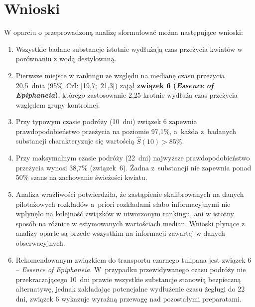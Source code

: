 \documentclass[12pt, a4paper]{article}
\begin{document}
\section{Wnioski}
W oparciu o przeprowadzoną analizę sformułować można następujące wnioski:
\begin{enumerate}[noitemsep]
    \item Wszystkie badane substancje istotnie wydłużają czas przeżycia kwiatów w porównaniu z wodą destylowaną. 
    \item Pierwsze miejsce w rankingu ze względu na medianę czasu przeżycia 20,5~dnia (95\%~CrI: [19,7;~21,3]) zajął \textbf{związek 6 (\textit{Essence of Epiphaneia})}, którego zastosowanie 2,25-krotnie wydłuża czas przeżycia względem grupy kontrolnej. 
    \item Przy typowym czasie podróży (10~dni) związek 6 zapewnia prawdopodobieństwo przeżycia na poziomie 97,1\%, a~każda z~badanych substancji charakteryzuje się wartością $\hat{S}(10) > 85\%$.
\item Przy maksymalnym czasie podróży (22~dni) najwyższe 
prawdopodobieństwo przeżycia wynosi 38,7\% (związek~6). 
Żadna z~substancji nie zapewnia ponad 50\% szans na zachowanie 
świeżości kwiatu.
    \item Analiza wrażliwości potwierdziła, że zastąpienie skalibrowanych na danych pilotażowych rozkładów a~priori rozkładami słabo informacyjnymi nie wpłynęło na kolejność związków w utworzonym rankingu, ani w istotny sposób na różnice w estymowanych wartościach median. Wnioski płynące z analizy oparte są przede wszystkim na informacji zawartej w danych obserwacyjnych.
    \item Rekomendowanym związkiem do transportu czarnego tulipana jest związek 6 -- \textit{Essence of Epiphaneia}. W~przypadku przewidywanego czasu podróży nie przekraczającego 10~dni prawie wszystkie substancje stanowią bezpieczną alternatywę, jednak zakładając potencjalne wydłużenie czasu żeglugi do 22 dni, związek 6 wykazuje wyraźną przewagę nad pozostałymi preparatami.
\end{enumerate}


\newpage
\printbibliography[title={Bibliografia}]
\end{document}

